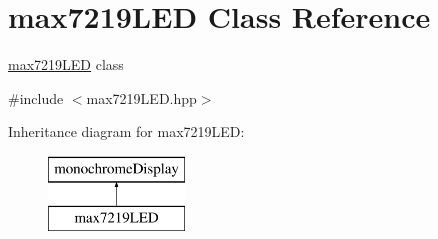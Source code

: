 \hypertarget{classmax7219_l_e_d}{}\section{max7219\+L\+ED Class Reference}
\label{classmax7219_l_e_d}


\hyperlink{classmax7219_l_e_d}{max7219\+L\+ED} class  




{\ttfamily \#include $<$max7219\+L\+E\+D.\+hpp$>$}

Inheritance diagram for max7219\+L\+ED\+:\begin{figure}[H]
\begin{center}
\leavevmode
\includegraphics[height=2.000000cm]{classmax7219_l_e_d}
\end{center}
\end{figure}
